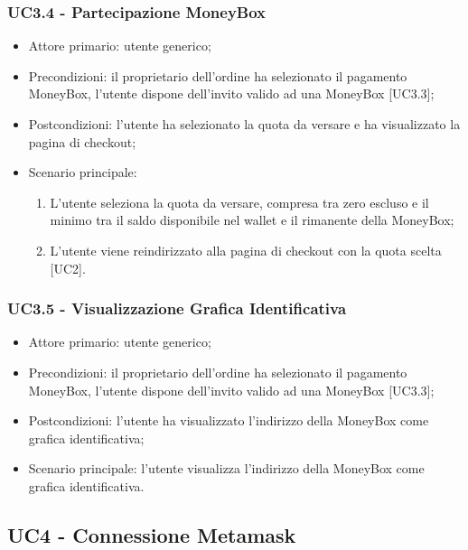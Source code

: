 \subsubsection{UC3.4 - Partecipazione MoneyBox}

\begin{itemize}
    \item Attore primario: utente generico;
    \item Precondizioni: il proprietario dell'ordine ha selezionato il pagamento MoneyBox\glo [UC2.2.2], 
            l'utente dispone dell'invito valido ad una MoneyBox\glo{} [UC3.3];
    \item Postcondizioni: l'utente ha selezionato la quota da versare e ha visualizzato la pagina di checkout;
    \item Scenario principale:
          \begin{enumerate}
              \item L'utente seleziona la quota da versare, compresa tra zero escluso e il minimo tra il saldo disponibile nel wallet\glo{} 
                    e il rimanente della MoneyBox\glo{};
              \item L'utente viene reindirizzato alla pagina di checkout con la quota scelta [UC2].
          \end{enumerate}
\end{itemize}

\subsubsection{UC3.5 - Visualizzazione Grafica Identificativa}

\begin{itemize}
    \item Attore primario: utente generico;
    \item Precondizioni: il proprietario dell'ordine ha selezionato il pagamento MoneyBox\glo [UC2.2.2], 
            l'utente dispone dell'invito valido ad una MoneyBox\glo{} [UC3.3];
    \item Postcondizioni: l'utente ha visualizzato l'indirizzo della MoneyBox\glo{} come grafica identificativa;
    \item Scenario principale: l'utente visualizza l'indirizzo della MoneyBox\glo{} come grafica identificativa.
\end{itemize}

\subsection{UC4 - Connessione Metamask}

